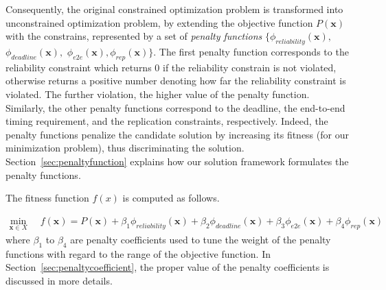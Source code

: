 Consequently, the original constrained optimization problem is transformed into unconstrained optimization problem, by extending the objective function $P(\textbf{x})$ with the constrains, represented by a set of \textit{penalty functions} $\{\phi_{reliability}(\textbf{x}),$  $\phi_{deadline}(\textbf{x}),$ $\phi_{e2e}(\textbf{x}), \phi_{rep}(\textbf{x})\}$. The first penalty function corresponds to the reliability constraint which returns 0 if the reliability constrain is not violated, otherwise returns a positive number denoting how far the reliability constraint is violated. The further violation, the higher value of the penalty function.
Similarly, the other penalty functions correspond to the deadline, the end-to-end timing requirement, and the replication constraints, respectively. 
Indeed, the penalty functions penalize the candidate solution by increasing its fitness (for our minimization problem), thus discriminating the solution. Section~\ref{sec:penaltyfunction} explains how our solution framework formulates the penalty functions.

The fitness function $f(x)$ is computed as follows.


\begin{align}
\label{eqn_penalityfunc}
\min_{\textbf{x}\in X}\;\;& f(\textbf{x})=P(\textbf{x}) + \beta_1 \phi_{reliability}(\textbf{x}) + \beta_2 \phi_{deadline}(\textbf{x}) + \beta_3 \phi_{e2e}(\textbf{x}) + \beta_4 \phi_{rep}(\textbf{x}) 
\end{align}
where $\beta_1$ to $\beta_4$ are penalty coefficients used to tune the weight of the penalty functions with regard to the range of the objective function. In Section~\ref{sec:penaltycoefficient}, the proper value of the penalty coefficients is discussed in more details.

